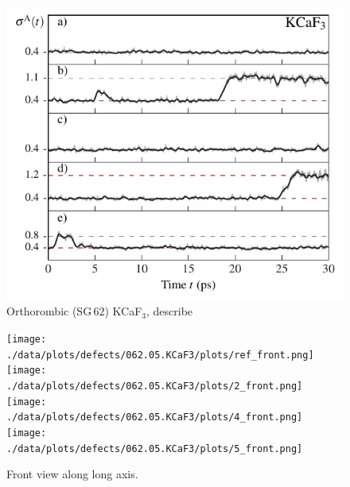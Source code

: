 \begin{figure}
	\includegraphics[width=\textwidth]{./data/plots/defects/062.05.KCaF3/sigma_vs_time.pdf}
	\caption{Orthorombic (SG\,62) KCaF$_3$, describe}
	\label{}
\end{figure}

\begin{figure}
	\texttt{[image: ./data/plots/defects/062.05.KCaF3/plots/ref\_front.png]} \hfill
	\texttt{[image: ./data/plots/defects/062.05.KCaF3/plots/2\_front.png]} \\
	\texttt{[image: ./data/plots/defects/062.05.KCaF3/plots/4\_front.png]} \hfill
	\texttt{[image: ./data/plots/defects/062.05.KCaF3/plots/5\_front.png]}
	\caption{Front view along long axis.}
	\label{}
\end{figure}

